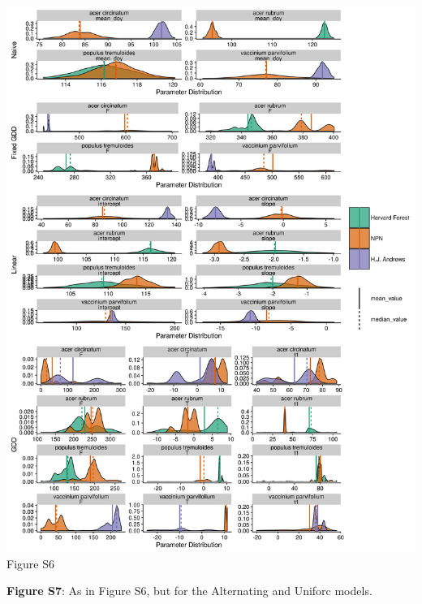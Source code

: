 \documentclass[a4paper,12pt]{article}
\begin{document}
\begin{center}
	\centering
		\includegraphics[scale=0.5]{supplement_select_species_param_comparison1.png}
	Figure S6
\end{center}

\newpage

\textbf{Figure S7}: As in Figure S6, but for the Alternating and Uniforc models. 

\newpage
\end{document}
